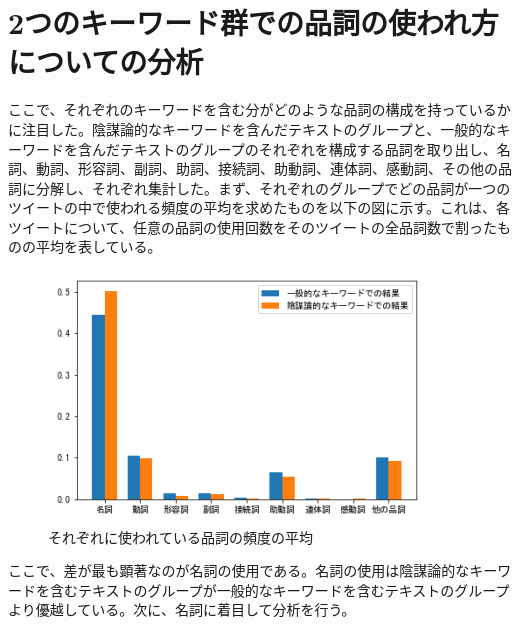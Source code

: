\documentclass[a4paper, dvipdfmx]{jsarticle}
\begin{document}
\section{2つのキーワード群での品詞の使われ方についての分析}
ここで、それぞれのキーワードを含む分がどのような品詞の構成を持っているかに注目した。陰謀論的なキーワードを含んだテキストのグループと、一般的なキーワードを含んだテキストのグループのそれぞれを構成する品詞を取り出し、名詞、動詞、形容詞、副詞、助詞、接続詞、助動詞、連体詞、感動詞、その他の品詞に分解し、それぞれ集計した。まず、それぞれのグループでどの品詞が一つのツイートの中で使われる頻度の平均を求めたものを以下の図に示す。これは、各ツイートについて、任意の品詞の使用回数をそのツイートの全品詞数で割ったものの平均を表している。
\begin{figure}[H]
\begin{center}
\includegraphics[width=100mm]{../images/fig3.png}
\caption{それぞれに使われている品詞の頻度の平均}
\end{center}
\end{figure}
ここで、差が最も顕著なのが名詞の使用である。名詞の使用は陰謀論的なキーワードを含むテキストのグループが一般的なキーワードを含むテキストのグループより優越している。次に、名詞に着目して分析を行う。
\end{document}

